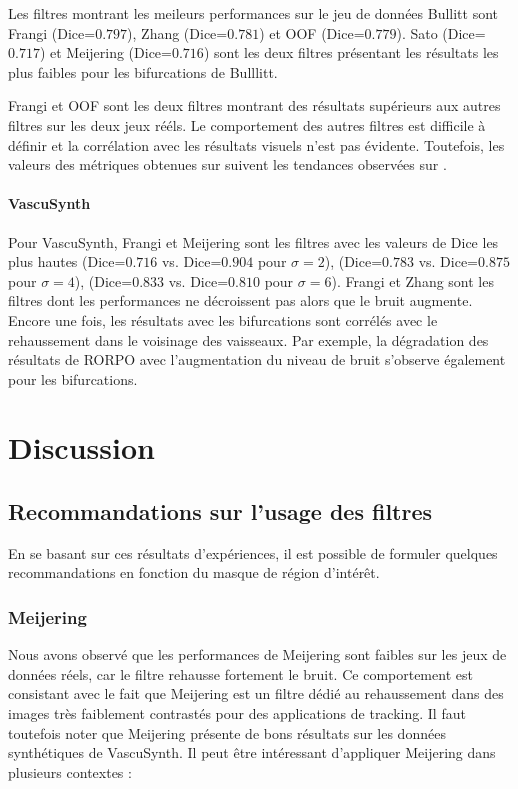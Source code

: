 Les filtres montrant les meileurs performances sur le jeu de données Bullitt sont Frangi (Dice=$0.797$), Zhang (Dice=$0.781$) et OOF (Dice=$0.779$). Sato (Dice=$0.717$) et Meijering (Dice=$0.716$) sont les deux filtres présentant les résultats les plus faibles pour les bifurcations de Bulllitt. 

Frangi et OOF sont les deux filtres montrant des résultats supérieurs aux autres filtres sur les deux jeux rééls. Le comportement des autres filtres est difficile à définir et la corrélation avec les résultats visuels n'est pas évidente. Toutefois, les valeurs des métriques obtenues sur \maskbif suivent les tendances observées sur \maskvascular.

\paragraph{VascuSynth}

Pour VascuSynth, Frangi et Meijering sont les filtres avec les valeurs de Dice les plus hautes (Dice=$0.716$ vs. Dice=$0.904$ pour $\sigma=2$), (Dice=$0.783$ vs. Dice=$0.875$ pour $\sigma=4$), (Dice=$0.833$ vs. Dice=$0.810$ pour $\sigma=6$). Frangi et Zhang sont les filtres dont les performances ne décroissent pas alors que le bruit augmente.
Encore une fois, les résultats avec les bifurcations sont corrélés avec le rehaussement dans le voisinage des vaisseaux. Par exemple, la dégradation des résultats de RORPO avec l'augmentation du niveau de bruit s'observe également pour les bifurcations.

\section{Discussion}

\subsection{Recommandations sur l'usage des filtres}

En se basant sur ces résultats d'expériences, il est possible de formuler quelques recommandations en fonction du masque de région d'intérêt.

\subsubsection*{Meijering}

 Nous avons observé que les performances de Meijering sont faibles sur les jeux de données réels, car le filtre rehausse fortement le bruit. Ce comportement est consistant avec le fait que Meijering est un filtre dédié au rehaussement dans des images très faiblement contrastés pour des applications de tracking. Il faut toutefois noter que Meijering présente de bons résultats sur les données synthétiques de VascuSynth. Il peut être intéressant d’appliquer Meijering dans plusieurs contextes :

